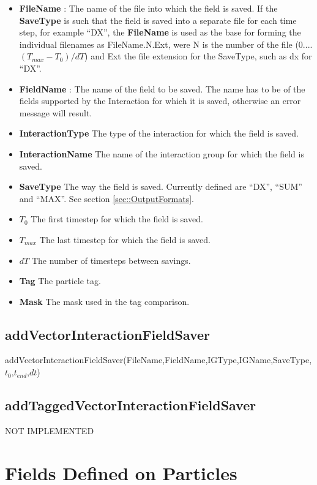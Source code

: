 \documentclass{report}
\begin{document}
\begin{itemize}
\item \textbf{FileName} : The name of the file into which the field is saved. If the  \textbf{SaveType} is such that the field is saved into a separate file for each time step, for example ``DX'', the \textbf{FileName} is used as the base for forming the individual filenames as FileName.N.Ext, were N is the number of the file (0....$(T_{max}-T_0)/dT$) and Ext the file extension for the SaveType, such as dx for ``DX''.
\item \textbf{FieldName} : The name of the field to be saved. The name has to be of the fields supported by the Interaction for which it is saved, otherwise an error message will result.
\item \textbf{InteractionType} The type of the interaction for which the field is saved.
\item \textbf{InteractionName} The name of the interaction group for which the field is saved.
\item \textbf{SaveType} The way the field is saved. Currently defined are ``DX'', ``SUM'' and ``MAX''. See section \ref{sec::OutputFormats}.
\item \textbf{$T_0$} The first timestep for which the field is saved.
\item \textbf{$T_{max}$} The last timestep for which the field is saved.
\item \textbf{$dT$} The number of timesteps between savings. 
\item \textbf{Tag} The particle tag.
\item \textbf{Mask} The mask used in the tag comparison.     
\end{itemize}
\subsection{addVectorInteractionFieldSaver}

\textsf{addVectorInteractionFieldSaver(FileName,FieldName,IGType,IGName,SaveType,$t_0$,$t_{end}$,$dt$)}

\subsection{addTaggedVectorInteractionFieldSaver}

\textsf{NOT IMPLEMENTED}

\section{Fields Defined on Particles}
\end{document}
